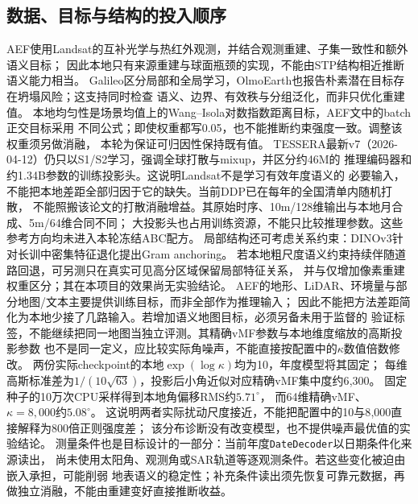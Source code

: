 \documentclass[UTF8,fontset=fandol,zihao=5,a4paper]{ctexart}
\begin{document}
\subsection{数据、目标与结构的投入顺序}
AEF使用Landsat的互补光学与热红外观测，并结合观测重建、子集一致性和额外语义目标；
因此本地只有来源重建与球面瓶颈的实现，不能由STP结构相近推断语义能力相当\cite{aef}。
Galileo区分局部和全局学习，OlmoEarth也报告朴素潜在目标存在坍塌风险；这支持同时检查
语义、边界、有效秩与分组泛化，而非只优化重建值\cite{galileo,olmoearth}。
本地均匀性是场景均值上的Wang--Isola对数指数距离目标，AEF文中的batch正交目标采用
不同公式；即使权重都写0.05，也不能推断约束强度一致。调整该权重须另做消融，
本轮为保证可归因性保持既有值。
TESSERA最新v7（2026-04-12）仍只以S1/S2学习，强调全球打散与mixup，并区分约46M的
推理编码器和约1.34B参数的训练投影头\cite{tessera}。这说明Landsat不是学习有效年度语义的
必要输入，不能把本地差距全部归因于它的缺失。当前DDP已在每年的全国清单内随机打散，
不能照搬该论文的打散消融增益。其原始时序、10m/128维输出与本地月合成、5m/64维合同不同；
大投影头也占用训练资源，不能只比较推理参数。这些参考方向均未进入本轮冻结ABC配方。
局部结构还可考虑关系约束：DINOv3针对长训中密集特征退化提出Gram anchoring\cite{dinov3}。
若本地粗尺度语义约束持续伴随道路回退，可另测只在真实可见高分区域保留局部特征关系，
并与仅增加像素重建权重区分；其在本项目的效果尚无实验结论。
AEF的地形、LiDAR、环境量与部分地图/文本主要提供训练目标，而非全部作为推理输入；
因此不能把方法差距简化为本地少接了几路输入。若增加语义地图目标，必须另备未用于监督的
验证标签，不能继续把同一地图当独立评测。其精确vMF参数与本地维度缩放的高斯投影参数
也不是同一定义，应比较实际角噪声，不能直接按配置中的$\kappa$数值倍数修改。
两份实际checkpoint的本地$\exp(\log\kappa)$均为10，年度模型将其固定；
每维高斯标准差为$1/(10\sqrt{63})$，投影后小角近似对应精确vMF集中度约6{,}300。
固定种子的10万次CPU采样得到本地角偏移RMS约$5.71^{\circ}$，
而64维精确vMF、$\kappa=8{,}000$约$5.08^{\circ}$。
这说明两者实际扰动尺度接近，不能把配置中的10与8{,}000直接解释为800倍正则强度差；
该分布诊断没有改变模型，也不提供噪声最优值的实验结论。
测量条件也是目标设计的一部分：当前年度\texttt{DateDecoder}以日期条件化来源读出，
尚未使用太阳角、观测角或SAR轨道等逐观测条件。若这些变化被迫由嵌入承担，可能削弱
地表语义的稳定性；补充条件读出须先恢复可靠元数据，再做独立消融，不能由重建变好直接推断收益。
\end{document}
